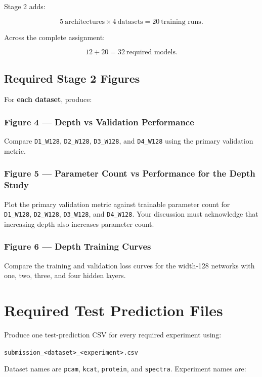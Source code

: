 \documentclass[11pt,a4paper]{article}
\newcommand{\code}[1]{\texttt{#1}}
\begin{document}
Stage 2 adds:

\[
5\ \text{architectures}\times4\ \text{datasets}
=20\ \text{training runs}.
\]

Across the complete assignment:

\[
12+20=\boxed{32\ \text{required models}}.
\]

\subsection{Required Stage 2 Figures}

For \textbf{each dataset}, produce:

\subsubsection*{Figure 4 --- Depth vs Validation Performance}

Compare \code{D1\_W128}, \code{D2\_W128}, \code{D3\_W128}, and \code{D4\_W128} using the primary validation metric.

\subsubsection*{Figure 5 --- Parameter Count vs Performance for the Depth Study}

Plot the primary validation metric against trainable parameter count for \code{D1\_W128}, \code{D2\_W128}, \code{D3\_W128}, and \code{D4\_W128}. Your discussion must acknowledge that increasing depth also increases parameter count.

\subsubsection*{Figure 6 --- Depth Training Curves}

Compare the training and validation loss curves for the width-128 networks with one, two, three, and four hidden layers.

\section{Required Test Prediction Files}

Produce one test-prediction CSV for every required experiment using:

\begin{center}
\code{submission\_<dataset>\_<experiment>.csv}
\end{center}

Dataset names are \code{pcam}, \code{kcat}, \code{protein}, and \code{spectra}. Experiment names are:
\end{document}
